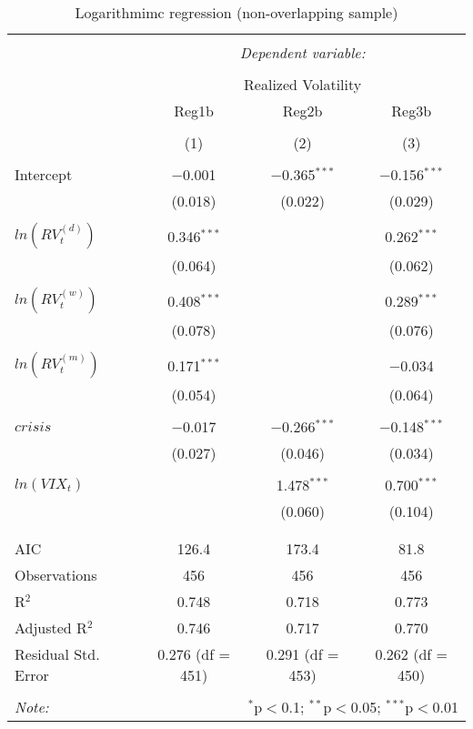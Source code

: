 
\begin{table}[!htbp] \centering 
  \caption{Logarithmimc regression (non-overlapping sample)} 
  \label{overlap2} 
\begin{tabular}{@{\extracolsep{5pt}}lccc} 
\\[-1.8ex]\hline 
\hline \\[-1.8ex] 
 & \multicolumn{3}{c}{\textit{Dependent variable:}} \\ 
\cline{2-4} 
\\[-1.8ex] & \multicolumn{3}{c}{Realized Volatility} \\ 
 & Reg1b & Reg2b & Reg3b \\ 
\\[-1.8ex] & (1) & (2) & (3)\\ 
\hline \\[-1.8ex] 
 Intercept & $-$0.001 & $-$0.365$^{***}$ & $-$0.156$^{***}$ \\ 
  & (0.018) & (0.022) & (0.029) \\ 
  & & & \\ 
 $ln(RV^{(d)}_{t})$ & 0.346$^{***}$ &  & 0.262$^{***}$ \\ 
  & (0.064) &  & (0.062) \\ 
  & & & \\ 
 $ln(RV^{(w)}_{t})$ & 0.408$^{***}$ &  & 0.289$^{***}$ \\ 
  & (0.078) &  & (0.076) \\ 
  & & & \\ 
 $ ln(RV^{(m)}_{t})$ & 0.171$^{***}$ &  & $-$0.034 \\ 
  & (0.054) &  & (0.064) \\ 
  & & & \\ 
 $crisis$ & $-$0.017 & $-$0.266$^{***}$ & $-$0.148$^{***}$ \\ 
  & (0.027) & (0.046) & (0.034) \\ 
  & & & \\ 
 $ln(VIX_{t})$ &  & 1.478$^{***}$ & 0.700$^{***}$ \\ 
  &  & (0.060) & (0.104) \\ 
  & & & \\ 
\hline \\[-1.8ex] 
AIC & 126.4 & 173.4 & 81.8 \\ 
Observations & 456 & 456 & 456 \\ 
R$^{2}$ & 0.748 & 0.718 & 0.773 \\ 
Adjusted R$^{2}$ & 0.746 & 0.717 & 0.770 \\ 
Residual Std. Error & 0.276 (df = 451) & 0.291 (df = 453) & 0.262 (df = 450) \\ 
\hline 
\hline \\[-1.8ex] 
\textit{Note:}  & \multicolumn{3}{r}{$^{*}$p$<$0.1; $^{**}$p$<$0.05; $^{***}$p$<$0.01} \\ 
\end{tabular} 
\end{table} 
